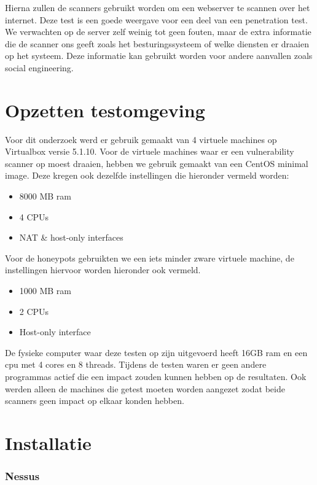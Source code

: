 Hierna zullen de scanners gebruikt worden om een webserver te scannen over het internet. Deze test is een goede weergave voor een deel van een penetration test. We verwachten op de server zelf weinig tot geen fouten, maar de extra informatie die de scanner ons geeft zoals het besturingssysteem of welke diensten er draaien op het systeem. Deze informatie kan gebruikt worden voor andere aanvallen zoals social engineering.

\section{Opzetten testomgeving}

Voor dit onderzoek werd er gebruik gemaakt van 4 virtuele machines op Virtualbox versie 5.1.10. Voor de virtuele machines waar er een vulnerability scanner op moest draaien, hebben we gebruik gemaakt van een CentOS minimal image. Deze kregen ook dezelfde instellingen die hieronder vermeld worden:

\begin{itemize}
\item 8000 MB ram
\item 4 CPUs
\item NAT \& host-only interfaces
\end{itemize}

Voor de honeypots gebruikten we een iets minder zware virtuele machine, de instellingen hiervoor worden hieronder ook vermeld. 

\begin{itemize}
\item 1000 MB ram
\item 2 CPUs
\item Host-only interface
\end{itemize}

De fysieke computer waar deze testen op zijn uitgevoerd heeft 16GB ram en een cpu met 4 cores en 8 threads. Tijdens de testen waren er geen andere programmas actief die een impact zouden kunnen hebben op de resultaten. Ook werden alleen de machines die getest moeten worden aangezet zodat beide scanners geen impact op elkaar konden hebben.

\section{Installatie}

\subsubsection{Nessus}

